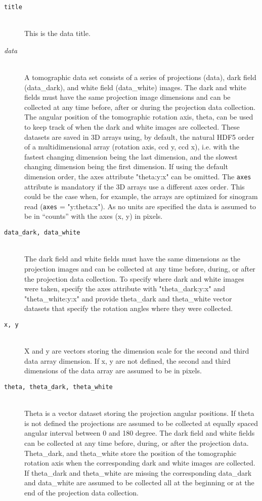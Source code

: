 \begin{description}
\item[\tt{title}] \hfill \\
{This is the data title.}

\item[\emph{data}] \hfill \\
{A tomographic data set consists of a series of projections (data), dark field (data\_dark), and white field (data\_white) images. The dark and white fields must have the same projection image dimensions and can be collected at any time before, after or during the projection data collection. The angular position of the tomographic rotation axis, theta, can be used to keep track of when the dark and white images are collected.  These datasets are saved in 3D arrays using, by default, the natural HDF5 order of a multidimensional array (rotation axis, ccd y, ccd x), i.e. with the fastest changing dimension being the last dimension, and the slowest changing dimension being the first dimension. If using the default dimension order, the axes attribute "theta:y:x" can be omitted. The {\tt{axes}} attribute is mandatory if the 3D arrays use a different axes order. This could be the case when, for example, the arrays are optimized for sinogram read ({\tt{axes}} = "y:theta:x"). As no units are specified the data is assumed to be in ``counts'' with the axes (x, y) in pixels. }


\item[\tt{data\_dark, data\_white}] \hfill \\
{The dark field and white fields must have the same dimensions as the projection images and can be collected at any time before, during, or after the projection data collection.  To specify where dark and white images were taken, specify the axes attribute with "theta\_dark:y:x" and "theta\_white:y:x" and provide theta\_dark and theta\_white vector datasets that specify the rotation angles where they were collected.}

\item[\tt{x, y}] \hfill \\
{X and y are vectors storing the dimension scale for the second and third data array dimension. If x, y are not defined, the second and third dimensions of the data array are assumed to be in pixels.}

\item[\tt{theta, theta\_dark, theta\_white}] \hfill \\
{Theta is a vector dataset storing the projection angular positions.  If theta is not defined the projections are assumed to be collected at equally spaced angular interval between 0 and 180 degree.  The dark field and white fields can be collected at any time before, during, or after the projection data. Theta\_dark, and theta\_white store the position of the tomographic rotation axis when the corresponding dark and white images are collected. If theta\_dark and theta\_white are missing the corresponding data\_dark and data\_white are assumed to be collected all at the beginning or at the end of the projection data collection.}


\end{description}

